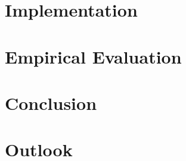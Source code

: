 \documentclass[12pt,a4paper,twoside,open=right,bibliography=totoc,BCOR=10mm]{scrreprt}
\begin{document}
\chapter{Implementation}
\label{ch:impl}


\chapter{Empirical Evaluation}
\label{ch:eval}


\chapter{Conclusion}
\label{ch:conclusion}


\chapter{Outlook}
\label{ch:outlook}



\listoffigures
{}
\listoftables
{}
\listofalgorithms
{}

\printglossary[type=\acronymtype]

\printbibliography
\end{document}
